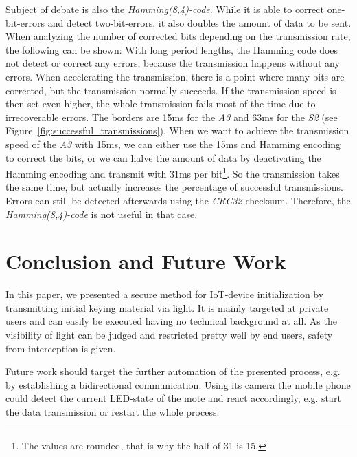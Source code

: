 \documentclass{sig-alternate} %
\begin{document}
Subject of debate is also the \textit{Hamming(8,4)-code}.
While it is able to correct one-bit-errors and detect two-bit-errors, it also doubles the amount of data to be sent.
When analyzing the number of corrected bits depending on the transmission rate, the following can be shown:
With long period lengths, the Hamming code does not detect or correct any errors, because the transmission happens without any errors.
When accelerating the transmission, there is a point where many bits are corrected, but the transmission normally succeeds.
If the transmission speed is then set even higher, the whole transmission fails most of the time due to irrecoverable errors.
The borders are 15ms for the \textit{A3} and 63ms for the \textit{S2} (see Figure~\ref{fig:successful_transmissions}).
When we want to achieve the transmission speed of the \textit{A3} with 15ms, we can either use the 15ms and Hamming encoding to correct the bits, or we can halve the amount of data by deactivating the Hamming encoding and transmit with 31ms per bit\footnote{The values are rounded, that is why the half of 31 is 15.}.
So the transmission takes the same time, but actually increases the percentage of successful transmissions.
Errors can still be detected afterwards using the \textit{CRC32} checksum.
Therefore, the \textit{Hamming(8,4)-code} is not useful in that case.



\section{Conclusion and Future Work}
\label{sec:future_work}

In this paper, we presented a secure method for IoT-device initialization by transmitting initial keying material via light.
It is mainly targeted at private users and can easily be executed having no technical background at all.
As the visibility of light can be judged and restricted pretty well by end users, safety from interception is given.

Future work should target the further automation of the presented process, e.g. by establishing a bidirectional communication.
Using its camera the mobile phone could detect the current LED-state of the mote and react accordingly, e.g. start the data transmission or restart the whole process.
\end{document}
